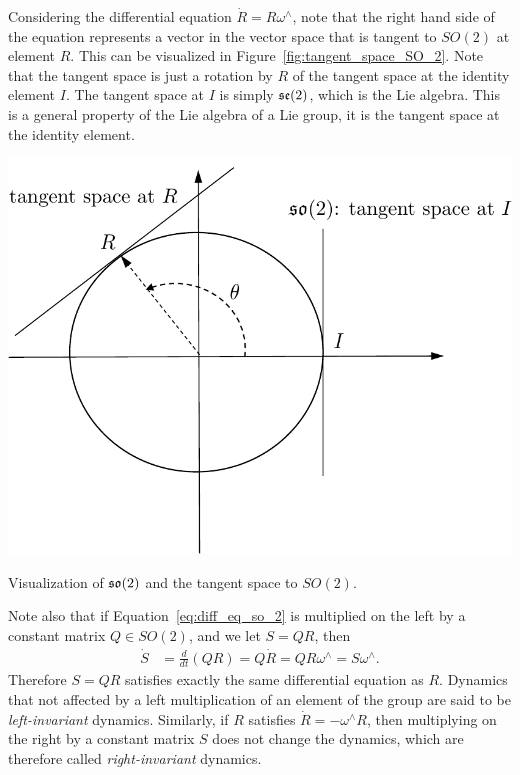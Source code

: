 Considering the differential equation $\dot{R}=R\omega^\wedge$, note that the right hand side of the equation represents a vector in the vector space that is tangent to $SO(2)$ at element $R$.  This can be visualized in Figure~\ref{fig:tangent_space_SO_2}.  Note that the tangent space is just a rotation by $R$ of the tangent space at the identity element $I$.  The tangent space at $I$ is simply $\mathfrak{se}(2)$, which is the Lie algebra.  This is a general property of the Lie algebra of a Lie group, it is the tangent space at the identity element.
\begin{marginfigure}[0in]
  \centering\includegraphics[width=\linewidth]{./chap2_preliminaries/figures/tangent_space_SO_2}
  \caption{Visualization of $\mathfrak{so}(2)$ and the tangent space to $SO(2)$.}
  \label{fig:tangent_space_SO_2}  
\end{marginfigure}

Note also that if Equation~\eqref{eq:diff_eq_so_2} is multiplied on the left by a constant matrix $Q\in SO(2)$, and we let $S=QR$, then
\begin{align*}
\dot{S} &= \frac{d}{dt}(QR) 
        = Q\dot{R} 
        = QR\omega^\wedge 
        = S\omega^\wedge.
\end{align*}
Therefore $S=QR$ satisfies exactly the same differential equation as $R$.  Dynamics that not affected by a left multiplication of an element of the group are said to be {\em left-invariant} dynamics.
Similarly, if $R$ satisfies $\dot{R} = -\omega^\wedge R$, then multiplying on the right by a constant matrix $S$ does not change the dynamics, which are therefore called {\em right-invariant} dynamics.


